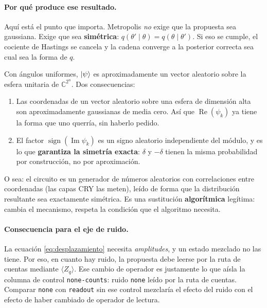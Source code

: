 \documentclass[11pt,a4paper]{article}
\newcommand{\Cu}[1]{\textcolor{cuantico}{\textbf{#1}}}
\begin{document}
\paragraph{Por qué produce ese resultado.} Aquí está el punto que importa.
Metropolis \emph{no} exige que la propuesta sea gaussiana. Exige que sea
\textbf{simétrica}: $q(\theta'\mid\theta) = q(\theta\mid\theta')$. Si eso se
cumple, el cociente de Hastings se cancela y la cadena converge a la
posterior correcta sea cual sea la forma de $q$.

Con ángulos uniformes, $\ket{\psi}$ es aproximadamente un vector aleatorio
sobre la esfera unitaria de $\mathbb{C}^{2^n}$. Dos consecuencias:

\begin{enumerate}[leftmargin=1.6em]
  \item Las coordenadas de un vector aleatorio sobre una esfera de dimensión
    alta son aproximadamente gaussianas de media cero. Así que
    $\operatorname{Re}(\psi_k)$ ya tiene la forma que uno querría, sin
    haberlo pedido.
  \item El factor $\operatorname{sign}(\operatorname{Im}\psi_k)$ es un signo
    aleatorio independiente del módulo, y es lo que \textbf{garantiza la
    simetría exacta}: $\delta$ y $-\delta$ tienen la misma probabilidad por
    construcción, no por aproximación.
\end{enumerate}

O sea: el circuito es un generador de números aleatorios con correlaciones
entre coordenadas (las capas CRY las meten), leído de forma que la
distribución resultante sea exactamente simétrica. Es una sustitución
\Cu{algorítmica} legítima: cambia el mecanismo, respeta la condición que el
algoritmo necesita.

\paragraph{Consecuencia para el eje de ruido.} La ecuación
\eqref{eq:desplazamiento} necesita \emph{amplitudes}, y un estado mezclado no
las tiene. Por eso, en cuanto hay ruido, la propuesta debe leerse por la ruta
de cuentas mediante $\langle Z_q\rangle$. Ese cambio de operador es
justamente lo que aísla la columna de control \texttt{none-counts}: ruido
\texttt{none} leído por la ruta de cuentas. Comparar \texttt{none} con
\texttt{readout} sin ese control mezclaría el efecto del ruido con el efecto
de haber cambiado de operador de lectura.

\end{document}
